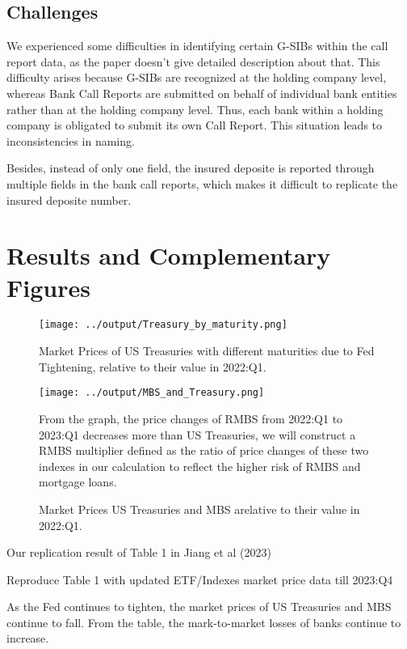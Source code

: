 \documentclass{article}
\begin{document}
\subsection{Challenges}

We experienced some difficulties in identifying certain G-SIBs within the call report data, as the paper doesn't give detailed description about that. This difficulty arises because G-SIBs are recognized at the holding company level, whereas Bank Call Reports are submitted on behalf of individual bank entities rather than at the holding company level. Thus, each bank within a holding company is obligated to submit its own Call Report. This situation leads to inconsistencies in naming.

Besides, instead of only one field, the insured deposite is reported through multiple fields in the bank call reports, which makes it difficult to replicate the insured deposite number. 

\section{Results and Complementary Figures}


\begin{figure}[H]
\centering
\texttt{[image: ../output/Treasury\_by\_maturity.png]}
\caption{\label{fig:myplot1}Market Prices of US Treasuries with different maturities due to Fed Tightening, relative to their value in 2022:Q1.}
\end{figure}

\begin{figure}[H]
\centering
\texttt{[image: ../output/MBS\_and\_Treasury.png]}
\caption{\label{fig:myplot2}Market Prices US Treasuries and MBS arelative to their value in 2022:Q1.}
From the graph, the price changes of RMBS from 2022:Q1 to 2023:Q1 decreases more than US Treasuries, we will construct a RMBS multiplier defined as the ratio of price changes of these two indexes in our calculation to reflect the higher risk of RMBS and mortgage loans.
\end{figure}



\begin{table}[H]

\centering

\caption{Our replication result of Table 1 in Jiang et al (2023)}
\label{table:Table1.tex}
\end{table}

\begin{table}[H]

\centering

\caption{Reproduce Table 1 with updated ETF/Indexes market price data till 2023:Q4}
As the Fed continues to tighten, the market prices of US Treasuries and MBS continue to fall. From the table, the mark-to-market losses of banks continue to increase.
\label{table:Table2.tex}
\end{table}
\end{document}
